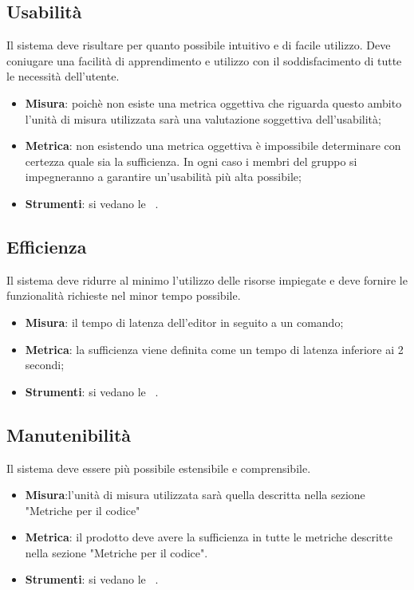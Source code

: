 \documentclass[../PianoDiQualifica.tex]{subfiles}
\begin{document}
	\subsection{Usabilità}
		Il sistema deve risultare per quanto possibile intuitivo e di facile utilizzo. Deve coniugare una facilità di apprendimento e utilizzo con il soddisfacimento di tutte le necessità dell'utente.
		\begin{itemize}
			\item \textbf{Misura}: poichè non esiste una metrica oggettiva che riguarda questo ambito l'unità di misura utilizzata sarà una valutazione soggettiva dell'usabilità;
			\item \textbf{Metrica}: non esistendo una metrica oggettiva è impossibile determinare con certezza quale sia la sufficienza. In ogni caso i membri del gruppo si impegneranno a garantire un'usabilità più alta possibile;
			\item \textbf{Strumenti}: si vedano le \normediprogettov\ .
		\end{itemize}
	\subsection{Efficienza}
		Il sistema deve ridurre al minimo l'utilizzo delle risorse impiegate e deve fornire le funzionalità richieste nel minor tempo possibile.
		\begin{itemize}
			\item \textbf{Misura}: il tempo di latenza dell'editor in seguito a un comando;
			\item \textbf{Metrica}: la sufficienza viene definita come un tempo di latenza inferiore ai 2 secondi;
			\item \textbf{Strumenti}: si vedano le \normediprogettov\ .
		\end{itemize}
	\subsection{Manutenibilità}
		Il sistema deve essere più possibile estensibile e comprensibile.
		\begin{itemize}
			\item \textbf{Misura}:l'unità di misura utilizzata sarà quella descritta nella sezione "Metriche per il codice" %
			\item \textbf{Metrica}: il prodotto deve avere la sufficienza in tutte le metriche descritte nella sezione "Metriche per il codice".
			\item \textbf{Strumenti}: si vedano le \normediprogettov\ .	
		\end{itemize}
\end{document}
